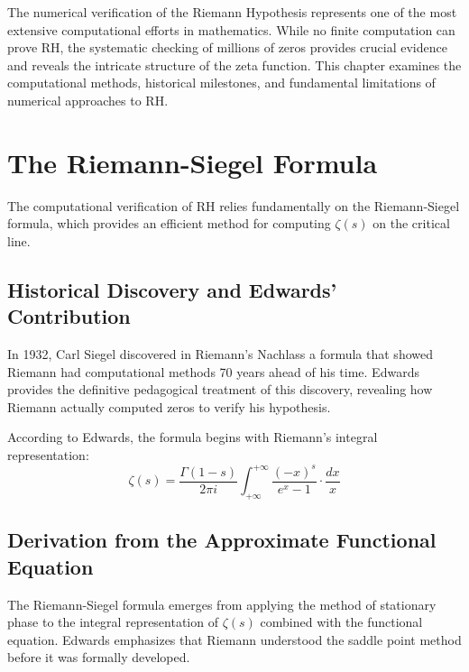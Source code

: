 \label{ch:computational}

The numerical verification of the Riemann Hypothesis represents one of the most extensive computational efforts in mathematics. While no finite computation can prove RH, the systematic checking of millions of zeros provides crucial evidence and reveals the intricate structure of the zeta function. This chapter examines the computational methods, historical milestones, and fundamental limitations of numerical approaches to RH.

\section{The Riemann-Siegel Formula}
\label{sec:riemann-siegel}

The computational verification of RH relies fundamentally on the Riemann-Siegel formula, which provides an efficient method for computing $\zeta(s)$ on the critical line.

\subsection{Historical Discovery and Edwards' Contribution}

\begin{historicalnote}
In 1932, Carl Siegel discovered in Riemann's Nachlass a formula that showed Riemann had computational methods 70 years ahead of his time. Edwards \cite{edwards1974} provides the definitive pedagogical treatment of this discovery, revealing how Riemann actually computed zeros to verify his hypothesis.
\end{historicalnote}

According to Edwards, the formula begins with Riemann's integral representation:
\begin{equation}
\zeta(s) = \frac{\Gamma(1-s)}{2\pi i} \int_{+\infty}^{+\infty} \frac{(-x)^s}{e^x - 1} \cdot \frac{dx}{x}
\end{equation}

\subsection{Derivation from the Approximate Functional Equation}

The Riemann-Siegel formula emerges from applying the method of stationary phase to the integral representation of $\zeta(s)$ combined with the functional equation. Edwards \cite{edwards1974} emphasizes that Riemann understood the saddle point method before it was formally developed.

